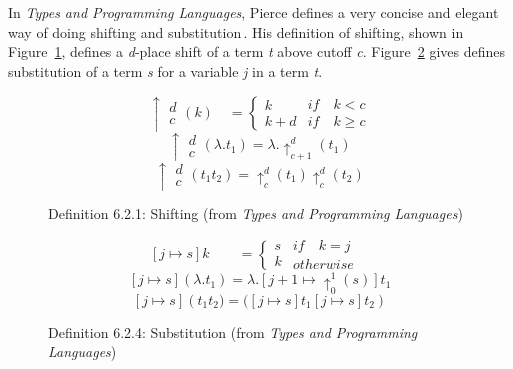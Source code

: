 In \textit{Types and Programming Languages}, Pierce defines a very concise and elegant way of doing shifting and substitution\,\cite[pp. 79-80]{Pierce:TypeSystems}. His definition of shifting, shown in Figure~\ref{fig:Pierce-shifting}, defines a \textit{d}-place shift of a term \textit{t} above cutoff \textit{c}. Figure~\ref{fig:Pierce-substitution} gives defines substitution of a term \textit{s} for a variable \textit{j} in a term \textit{t}.

\begin{figure}
\[\uparrow \begin{matrix} d \\ c \end{matrix}(k)\quad = \begin{cases} k \\ k+d \end{cases}\begin{matrix} if\quad k < c \\ if\quad k \ge c \end{matrix}\]
\[\uparrow \begin{matrix} d \\ c \end{matrix}(\lambda .{ t }_{ 1 }) = \lambda .{ \uparrow  }_{ c+1 }^{ d }({ t }_{ 1 })\]
\[\uparrow \begin{matrix} d \\ c \end{matrix}({ t }_{ 1 }{ t }_{ 2 }) = { \uparrow  }_{ c }^{ d }({ t }_{ 1 }) { \uparrow  }_{ c }^{ d }({ t }_{ 2 })\]
\caption{Definition 6.2.1: Shifting (from \textit{Types and Programming Languages})}
\label{fig:Pierce-shifting}
\end{figure}

\begin{figure}
\[[j\mapsto s]k\quad\quad=\begin{cases} s \\ k \end{cases}\begin{matrix} if\quad k=j\quad \\ otherwise \end{matrix}\]
\[[j\mapsto s](\lambda .{ t }_{ 1 })=\lambda .[j+1\mapsto { \uparrow  }_{ 0 }^{ 1 }(s)]{ t }_{ 1 }\]
\[[j\mapsto s]({ { t }_{ 1 }{ t }_{ 2 })=( }[j\mapsto s]{ t }_{ 1 }[j\mapsto s]{ t }_{ 2 })\]
\caption{Definition 6.2.4: Substitution (from \textit{Types and Programming Languages})}
\label{fig:Pierce-substitution}
\end{figure}

